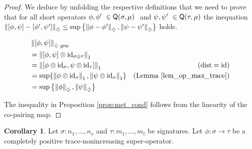 \documentclass[10pt,a4paper]{amsart}
\theoremstyle{definition}
\theoremstyle{definition}
\theoremstyle{definition}
\theoremstyle{definition}
\theoremstyle{definition}
\newtheorem{corollary}[definition]{Corollary}
\theoremstyle{definition}
\begin{document}
\begin{proof}
  We deduce by unfolding the respective definitions that we need to prove that for all short operators $\phi, \phi' \in \catQ(\sigma,\mu)  $ and $\psi, \psi' \in \catQ(\tau,\mu) $ the inequation $\left\lVert [\phi, \psi] - [\phi', \psi'] \right\rVert_{\diamondsuit} \leq  \sup \left\{ \left\lVert \phi-\phi' \right\rVert_{\diamondsuit}, \left\lVert \psi-\psi' \right\rVert_{\diamondsuit} \right\}$ holds.
 

    \begin{align*}
      & \left\lVert [\phi, \psi] \right\rVert_{ \diamondsuit \text{ gen}} \\
      &= \left\lVert [\phi, \psi] \otimes \mathrm{id}_{\sigma\oplus\tau} \right\rVert_{1} \\
      &= \left\lVert [\phi \otimes \mathrm{id}_\sigma, \psi \otimes \mathrm{id}_\tau] \right\rVert_{1}& (\mathrm{dist}=\mathrm{id}) \\
      & =  \sup \{ \left\lVert \phi \otimes \mathrm{id}_\sigma \right\rVert_{1}, \left\lVert \psi \otimes \mathrm{id}_\sigma \right\rVert_{1} \} & (\text{Lemma \ref{lem_op_max_trace}})\\
      & = \sup \left\{ \left\lVert \phi \right\rVert_{\diamondsuit}, \left\lVert \psi \right\rVert_{\diamondsuit} \right\}
    \end{align*}

  
The inequality in Proposition \ref{prop:met_cond} follows from the linearity of the co-pairing map.
\end{proof}





  \begin{corollary} \label{cor:gen_diamond_cptp_norm}
    Let $\sigma: n_1, \ldots, n_s$ and  $\tau: m_1, \ldots, m_t$  be signatures. Let  $\phi: \sigma  \rightarrow \tau$ be a  completely positive trace-nonincreasing super-operator. 
  \end{corollary}
  
\end{document}
